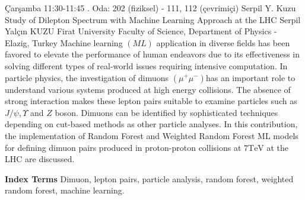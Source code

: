 
    \begin{abstract_basarim}
    {Çarşamba 11:30-11:45}
    {.}
    {Oda: 202 (fiziksel) - 111, 112 (çevrimiçi)}
    {Serpil Y. Kuzu}
    {Study of Dilepton Spectrum with Machine Learning Approach at the LHC}
    {%
    Serpil Yalçın KUZU}
    {%
    }
    {%
    Firat University Faculty of Science, Department of Physics - Elazig, Turkey}
    Machine learning $(M L)$ application in diverse fields has been favored to elevate the performance of human endeavors due to its effectiveness in solving different types of real-world issues requiring intensive computation. In particle physics, the investigation of dimuons $\left(\mu^{+} \mu^{-}\right)$has an important role to understand various systems produced at high energy collisions. The absence of strong interaction makes these lepton pairs suitable to examine particles such as $J / \psi, \Upsilon$ and $Z$ boson. Dimuons can be identified by sophisticated techniques depending on cut-based methods as other particle analyses. In this contribution, the implementation of Random Forest and Weighted Random Forest ML models for defining dimuon pairs produced in proton-proton collisions at $7 \mathrm{TeV}$ at the LHC are discussed. 
    
            \textbf{Index Terms} \newline{}Dimuon, lepton pairs, particle analysis, random forest, weighted random forest, machine learning.
    \end{abstract_basarim}
    